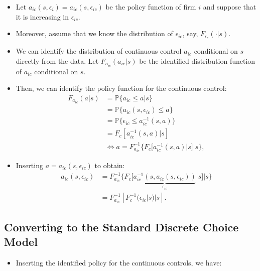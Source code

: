 \documentclass[
]{book}
\providecommand{\tightlist}{%
  \setlength{\itemsep}{0pt}\setlength{\parskip}{0pt}}
\begin{document}
\begin{itemize}
\tightlist
\item
  Let \(a_{ic}(s, \epsilon_{i}) = a_{ic}(s, \epsilon_{ic})\) be the
  policy function of firm \(i\) and suppose that it is increasing in
  \(\epsilon_{ic}\).
\item
  Moreover, assume that we know the distribution of \(\epsilon_{ic}\),
  say, \(F_{\epsilon_c}(\cdot|s)\).
\item
  We can identify the distribution of continuous control \(a_{ic}\)
  conditional on \(s\) directly from the data. Let
  \(F_{a_{ic}}(a_{ic}|s)\) be the identified distribution function of
  \(a_{ic}\) conditional on \(s\).
\item
  Then, we can identify the policy function for the continuous
  control: \begin{equation}
  \begin{split}
  F_{a_{ic}}(a|s) &= \mathbb{P}\{a_{ic} \le a|s\}\\
  &= \mathbb{P}\{a_{ic}(s, \epsilon_{ic}) \le a\}\\
  &=\mathbb{P}\{\epsilon_{ic} \le a_{ic}^{-1}(s, a)\}\\
  &=F_c[a_{ic}^{-1}(s, a)|s]\\
  &\Leftrightarrow a = F_{a_{ic}}^{-1}\{F_c[a_{ic}^{-1}(s, a)|s]|s\},
  \end{split}
  \end{equation}
\item
  Inserting \(a = a_{ic}(s, \epsilon_{ic})\) to obtain: \begin{equation}
  \begin{split}
  a_{ic}(s, \epsilon_{ic}) &= F_{a_{ic}}^{-1}\{F_c[\underbrace{a_{ic}^{-1}(s, a_{ic}(s, \epsilon_{ic}))}_{\epsilon_{ic}}|s]|s\}\\
  & = F_{a_{ic}}^{-1}[F_c^{-1}(\epsilon_{ic}|s)|s].
  \end{split}
  \end{equation}
\end{itemize}

\hypertarget{converting-to-the-standard-discrete-choice-model}{%
\subsection{Converting to the Standard Discrete Choice Model}\label{converting-to-the-standard-discrete-choice-model}}

\begin{itemize}
\tightlist
\item
  Inserting the identified policy for the continuous controls, we
  have:
\end{itemize}
\end{document}
